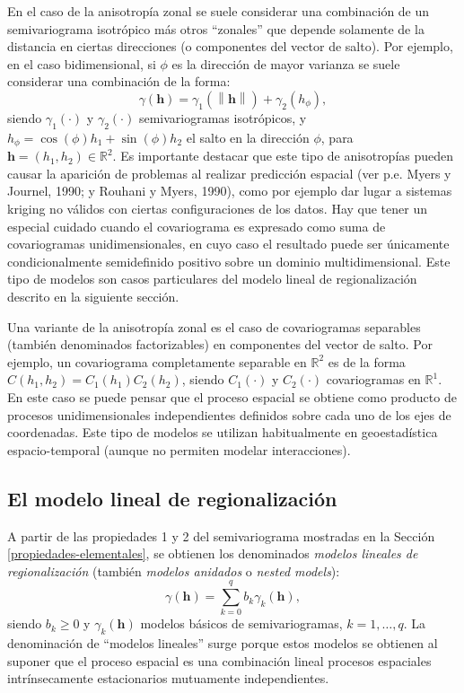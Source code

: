 \documentclass[
  spanish,
]{book}
\theoremstyle{break}
\theoremstyle{definition}
\theoremstyle{definition}
\theoremstyle{definition}
\theoremstyle{definition}
\theoremstyle{remark}
\begin{document}
En el caso de la anisotropía zonal se suele considerar una combinación de un semivariograma isotrópico más otros ``zonales'' que depende solamente de la distancia en ciertas direcciones (o componentes del vector de salto).
Por ejemplo, en el caso bidimensional, si \(\phi\) es la dirección de mayor varianza se suele considerar una combinación de la forma:
\[\gamma(\mathbf{h})=\gamma_1 (\left\| \mathbf{h}\right\|)+\gamma_2(h_{\phi }),\]
siendo \(\gamma_1 (\cdot)\) y \(\gamma_2 (\cdot)\) semivariogramas isotrópicos, y \(h_{\phi } =\cos (\phi)h_1 +\sin(\phi)h_2\) el salto en la dirección \(\phi\), para \(\mathbf{h}=(h_1 ,h_2)\in \mathbb{R} ^{2}\).
Es importante destacar que este tipo de anisotropías pueden causar la aparición de problemas al realizar predicción espacial (ver p.e. Myers y Journel, 1990; y Rouhani y Myers, 1990), como por ejemplo dar lugar a sistemas kriging no válidos con ciertas configuraciones de los datos.
Hay que tener un especial cuidado cuando el covariograma es expresado como suma de covariogramas unidimensionales, en cuyo caso el resultado puede ser únicamente condicionalmente semidefinido positivo sobre un dominio multidimensional.
Este tipo de modelos son casos particulares del modelo lineal de regionalización descrito en la siguiente sección.

Una variante de la anisotropía zonal es el caso de covariogramas separables (también denominados factorizables) en componentes del vector de salto.
Por ejemplo, un covariograma completamente separable en \(\mathbb{R}^2\) es de la forma \(C(h_1, h_2)= C_1(h_1)C_2(h_2)\), siendo \(C_1(\cdot)\) y \(C_2(\cdot)\) covariogramas en \(\mathbb{R}^{1}\).
En este caso se puede pensar que el proceso espacial se obtiene como producto de procesos unidimensionales independientes definidos sobre cada uno de los ejes de coordenadas.
Este tipo de modelos se utilizan habitualmente en geoestadística espacio-temporal (aunque no permiten modelar interacciones).

\hypertarget{vario-lin-reg}{%
\subsection{El modelo lineal de regionalización}\label{vario-lin-reg}}

A partir de las propiedades 1 y 2 del semivariograma mostradas en la Sección \ref{propiedades-elementales}, se obtienen los denominados \emph{modelos lineales de regionalización} (también \emph{modelos anidados} o \emph{nested models}):
\[\gamma(\mathbf{h}) = \sum\limits_{k=0}^{q}b_{k} \gamma_{k}(\mathbf{h}),\]
siendo \(b_k \ge 0\) y \(\gamma_{k}(\mathbf{h})\) modelos básicos de semivariogramas, \(k=1, \ldots, q\).
La denominación de ``modelos lineales'' surge porque estos modelos se obtienen al suponer que el proceso espacial es una combinación lineal procesos espaciales intrínsecamente estacionarios mutuamente independientes.
\end{document}
